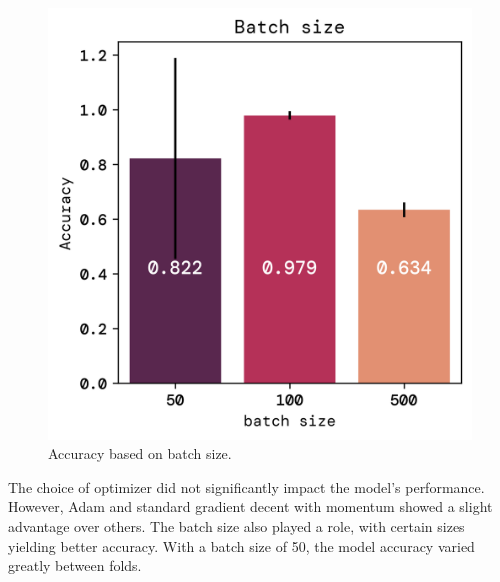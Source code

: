 \documentclass[twoside,11pt]{report}
\begin{document}
\begin{figure}[ht]
\begin{minipage}[t]{0.5\textwidth - 1mm}
\begin{center}
                \includegraphics[width=\textwidth]{../runsAndFigures/accuracy_batch.png}
            \end{center}
            \caption
            {
                Accuracy based on batch size.
            }\label{fig:accuracy_batch}
        \end{minipage}
    \end{figure}

    \noindent
    The choice of optimizer did not significantly impact the model's performance. However, 
    Adam and standard gradient decent with momentum showed a slight advantage over others. 
    The batch size also played a role, with certain sizes yielding better accuracy. With a batch size of 50,
    the model accuracy varied greatly between folds.
\end{document}
